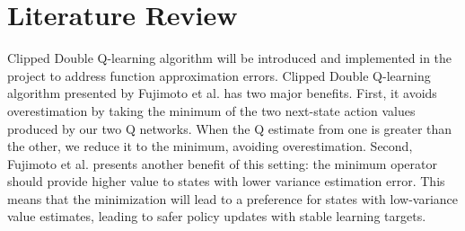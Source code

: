 \documentclass{article}
\begin{document}
\section{Literature Review}

Clipped Double Q-learning algorithm will be introduced and implemented in the
project to address function approximation errors. Clipped Double Q-learning
algorithm presented by Fujimoto et al. has two major benefits. First, it avoids
overestimation by taking the minimum of the two next-state action values
produced by our two Q networks. When the Q estimate from one is greater than the
other, we reduce it to the minimum, avoiding overestimation. Second, Fujimoto et
al. presents another benefit of this setting: the minimum operator should
provide higher value to states with lower variance estimation error.  This means
that the minimization will lead to a preference for states with low-variance
value estimates, leading to safer policy updates with stable learning targets.


\end{document}
